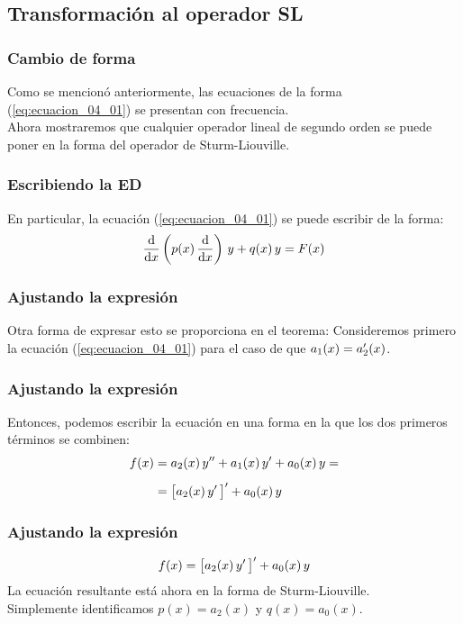 \documentclass[12pt]{beamer}
\begin{document}
\subsection{Transformación al operador SL}

\begin{frame}
\frametitle{Cambio de forma}
Como se mencionó anteriormente, las ecuaciones de la forma (\ref{eq:ecuacion_04_01}) se presentan con frecuencia.
\\
\bigskip
\pause
Ahora mostraremos que cualquier operador lineal de segundo orden se puede poner en la forma del operador de Sturm-Liouville.
\end{frame}
\begin{frame}
\frametitle{Escribiendo la ED}
En particular, la ecuación (\ref{eq:ecuacion_04_01}) se puede escribir de la forma:
\pause
\begin{align}
\dv{x} \left( p(x) \, \dv{x} \right) \, y + q(x) \, y =  F(x)
\label{eq:ecuacion_04_05}
\end{align}
\end{frame}
\begin{frame}
\frametitle{Ajustando la expresión}
Otra forma de expresar esto se proporciona en el teorema: \pause Consideremos primero la ecuación (\ref{eq:ecuacion_04_01}) para el caso de que $a_{1} (x) = {a}^{\prime}_{2} (x)$.
\end{frame}
\begin{frame}
\frametitle{Ajustando la expresión}
Entonces, podemos escribir la ecuación en una forma en la que los dos primeros términos se combinen:
\pause
\begin{align}
\begin{aligned}
f(x) &= a_{2} (x) \, {y}^{\prime \prime} + a_{1} (x) \, {y}^{\prime} + a_{0} (x) \, y = \\[0.5em]
&= \big[ a_{2} (x) \, {y}^{\prime} \, \big]^{\prime} + a_{0} (x) \, y
\end{aligned}
\label{eq:ecuacion_04_06}
\end{align}
\end{frame}
\begin{frame}
\frametitle{Ajustando la expresión}
\begin{align*}
f(x) = \big[ a_{2} (x) \, {y}^{\prime} \, \big]^{\prime} + a_{0} (x) \, y
\end{align*}
La ecuación resultante está ahora en la forma de Sturm-Liouville.
\\
\bigskip
Simplemente identificamos $p(x) = a_{2} (x)$ y $q (x) = a_{0} (x)$.
\end{frame}
\end{document}

